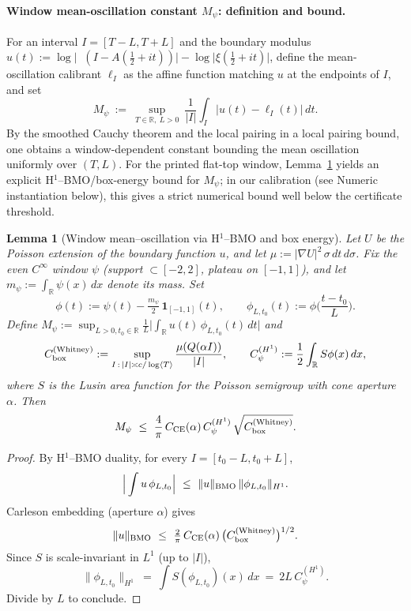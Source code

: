 \documentclass[11pt]{article}
\newtheorem{lemma}[theorem]{Lemma}
\theoremstyle{definition}
\theoremstyle{remark}
\newcommand{\R}{\mathbb{R}}
\DeclareMathOperator{\dettwo}{det_2}
\begin{document}
\paragraph{Window mean-oscillation constant \(M_\psi\): definition and bound.}
For an interval \(I=[T{-}L,T{+}L]\) and the boundary modulus \(u(t):=\log\big|\dettwo(I{-}A(\tfrac12{+}it))\big|{-}\log\big|\xi(\tfrac12{+}it)\big|\), define the mean-oscillation calibrant \(\ell_I\) as the affine function matching \(u\) at the endpoints of \(I\), and set
\[
  M_\psi\ :=\ \sup_{T\in\R,\ L>0}\ \frac{1}{|I|}\int_I \big|u(t)-\ell_I(t)\big|\,dt.
\]
By the smoothed Cauchy theorem and the local pairing in a local pairing bound, one obtains a window-dependent constant bounding the mean oscillation uniformly over $(T,L)$. For the printed flat-top window, Lemma~\ref{lem:Mpsi-correct} yields an explicit H$^1$--BMO/box-energy bound for $M_\psi$; in our calibration (see Numeric instantiation below), this gives a strict numerical bound well below the certificate threshold.
\begin{lemma}[Window mean--oscillation via H$^1$--BMO and box energy]\label{lem:Mpsi-correct}
Let $U$ be the Poisson extension of the boundary function $u$, and let $\mu := |\nabla U|^2\,\sigma\,dt\,d\sigma$.
Fix the even $C^\infty$ window $\psi$ (support $\subset[-2,2]$, plateau on $[-1,1]$), and let $m_\psi:=\int_{\R}\psi(x)\,dx$ denote its mass. Set
\[
\phi(t):=\psi(t)-\tfrac{m_\psi}{2}\,\mathbf 1_{[-1,1]}(t),\qquad 
\phi_{L,t_0}(t):=\phi\!\Big(\frac{t-t_0}{L}\Big).
\]
Define $M_\psi:=\sup_{L>0,t_0\in\R}\frac1L\big|\int_\R u(t)\,\phi_{L,t_0}(t)\,dt\big|$ and
\[
C_{\rm box}^{(\mathrm{Whitney})}:=\sup_{I\,:\,|I|\asymp c/\log\langle T\rangle}\frac{\mu(Q(\alpha I))}{|I|},\qquad
C_\psi^{(H^1)}:=\frac12\int_{\R} S\phi(x)\,dx,
\]
where $S$ is the Lusin area function for the Poisson semigroup with cone aperture $\alpha$.
Then
\[
M_\psi\ \le\ \frac{4}{\pi}\,C_{\mathrm{CE}}(\alpha)\,C_\psi^{(H^1)}\,\sqrt{C_{\rm box}^{(\mathrm{Whitney})}}.
\]
\end{lemma}
\begin{proof}
By H$^1$--BMO duality, for every $I=[t_0-L,t_0+L]$,
\[ \Big|\int u\,\phi_{L,t_0}\Big|\ \le\ \|u\|_{\rm BMO}\,\|\phi_{L,t_0}\|_{H^1}. \]
Carleson embedding (aperture $\alpha$) gives
\[ \|u\|_{\rm BMO}\ \le\ \tfrac{2}{\pi}\,C_{\mathrm{CE}}(\alpha)\,\big(C_{\rm box}^{(\mathrm{Whitney})}\big)^{1/2}. \]
Since $S$ is scale-invariant in $L^1$ (up to $|I|$),
\[ \|\phi_{L,t_0}\|_{H^1}\ =\ \int S(\phi_{L,t_0})(x)\,dx\ =\ 2L\,C_\psi^{(H^1)}. \]
Divide by $L$ to conclude.
\end{proof}
\end{document}
